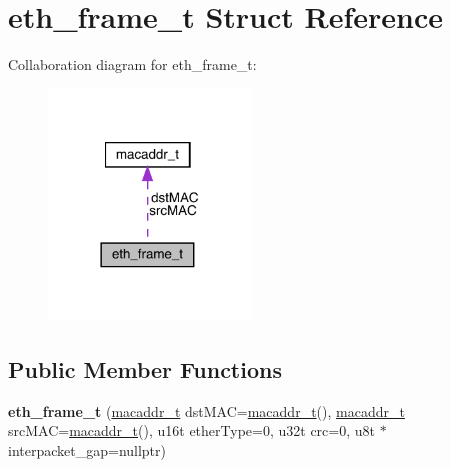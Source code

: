 \hypertarget{structeth__frame__t}{}\section{eth\+\_\+frame\+\_\+t Struct Reference}
\label{structeth__frame__t}


Collaboration diagram for eth\+\_\+frame\+\_\+t\+:\nopagebreak
\begin{figure}[H]
\begin{center}
\leavevmode
\includegraphics[width=153pt]{structeth__frame__t__coll__graph}
\end{center}
\end{figure}
\subsection*{Public Member Functions}
\begin{DoxyCompactItemize}
\item 
\mbox{\label{structeth__frame__t_a8617affa4463b4e4b29484ddc6704ae1}} 
{\bfseries eth\+\_\+frame\+\_\+t} (\mbox{\hyperlink{structmacaddr__t}{macaddr\+\_\+t}} dst\+M\+AC=\mbox{\hyperlink{structmacaddr__t}{macaddr\+\_\+t}}(), \mbox{\hyperlink{structmacaddr__t}{macaddr\+\_\+t}} src\+M\+AC=\mbox{\hyperlink{structmacaddr__t}{macaddr\+\_\+t}}(), u16t ether\+Type=0, u32t crc=0, u8t $\ast$interpacket\+\_\+gap=nullptr)
\end{DoxyCompactItemize}
